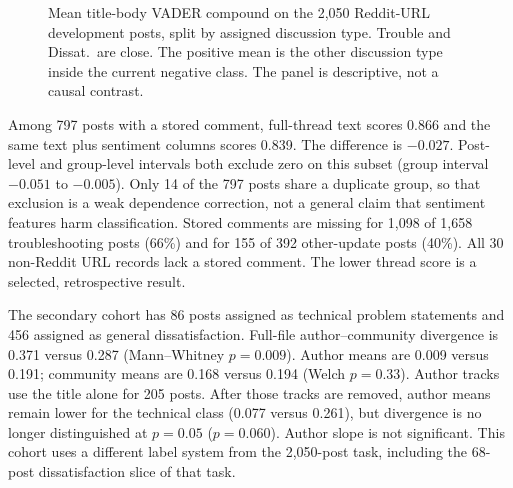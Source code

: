 \documentclass[conference,letterpaper]{IEEEtran}
\begin{document}
\begin{figure}[t]
\centering
{}
\caption{Mean title-body VADER compound on the 2,050 Reddit-URL development posts, split by assigned discussion type. Trouble and Dissat.\ are close. The positive mean is the other discussion type inside the current negative class. The panel is descriptive, not a causal contrast.}
\label{fig:valence}
\end{figure}

Among 797 posts with a stored comment, full-thread text scores 0.866 and the same text plus sentiment columns scores 0.839. The difference is $-0.027$. Post-level and group-level intervals both exclude zero on this subset (group interval $-0.051$ to $-0.005$). Only 14 of the 797 posts share a duplicate group, so that exclusion is a weak dependence correction, not a general claim that sentiment features harm classification. Stored comments are missing for 1,098 of 1,658 troubleshooting posts (66\%) and for 155 of 392 other-update posts (40\%). All 30 non-Reddit URL records lack a stored comment. The lower thread score is a selected, retrospective result.

The secondary cohort has 86 posts assigned as technical problem statements and 456 assigned as general dissatisfaction. Full-file author--community divergence is 0.371 versus 0.287 (Mann--Whitney $p=0.009$). Author means are 0.009 versus 0.191; community means are 0.168 versus 0.194 (Welch $p=0.33$). Author tracks use the title alone for 205 posts. After those tracks are removed, author means remain lower for the technical class (0.077 versus 0.261), but divergence is no longer distinguished at $p=0.05$ ($p=0.060$). Author slope is not significant. This cohort uses a different label system from the 2,050-post task, including the 68-post dissatisfaction slice of that task.
\end{document}
